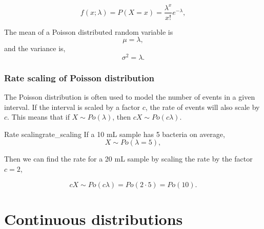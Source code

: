 \begin{equation}
f(x;\lambda) = P(X=x) = \frac{\lambda^x}{x!} e^{-\lambda},
\end{equation}

The mean of a Poisson distributed random variable is
\begin{equation}
\mu = \lambda,
\end{equation}
and the variance is,
\begin{equation}
\sigma^2 = \lambda.
\end{equation}

\subsubsection{Rate scaling of Poisson distribution}

The Poisson distribution is often used to model the number of events in a given interval. If the interval is scaled by a factor $c$, the rate of events will also scale by $c$. This means that if $X \sim Po(\lambda)$, then $cX \sim Po(c\lambda)$.

\begin{example}{Rate scaling}{rate_scaling}
If a 10 mL sample has 5 bacteria on average,
\begin{equation*}
X \sim Po(\lambda = 5),
\end{equation*}

Then we can find the rate for a 20 mL sample by scaling the rate by the factor $c = 2$,

\begin{equation*}
cX \sim Po(c\lambda) = Po(2 \cdot 5) = Po(10).
\end{equation*}
\end{example}

\section{Continuous distributions}

